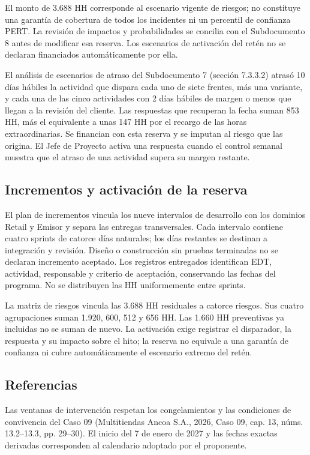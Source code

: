 \documentclass[11pt]{article}
\begin{document}
El monto de 3.688 HH corresponde al escenario vigente de riesgos; no constituye una garantía de cobertura de todos los incidentes ni un percentil de confianza PERT. La revisión de impactos y probabilidades se concilia con el Subdocumento 8 antes de modificar esa reserva. Los escenarios de activación del retén no se declaran financiados automáticamente por ella.

El análisis de escenarios de atraso del Subdocumento 7 (sección 7.3.3.2) atrasó 10 días hábiles la actividad que dispara cada uno de siete frentes, más una variante, y cada una de las cinco actividades con 2 días hábiles de margen o menos que llegan a la revisión del cliente. Las respuestas que recuperan la fecha suman 853 HH, más el equivalente a unas 147 HH por el recargo de las horas extraordinarias. Se financian con esta reserva y se imputan al riesgo que las origina. El Jefe de Proyecto activa una respuesta cuando el control semanal muestra que el atraso de una actividad supera su margen restante.

\subsection{Incrementos y activación de la reserva}

El plan de incrementos vincula los nueve intervalos de desarrollo con los dominios Retail y Emisor y separa las entregas transversales. Cada intervalo contiene cuatro sprints de catorce días naturales; los días restantes se destinan a integración y revisión. Diseño o construcción sin pruebas terminadas no se declaran incremento aceptado. Los registros entregados identifican EDT, actividad, responsable y criterio de aceptación, conservando las fechas del programa. No se distribuyen las HH uniformemente entre sprints.

La matriz de riesgos vincula las 3.688 HH residuales a catorce riesgos. Sus cuatro agrupaciones suman 1.920, 600, 512 y 656 HH. Las 1.660 HH preventivas ya incluidas no se suman de nuevo. La activación exige registrar el disparador, la respuesta y su impacto sobre el hito; la reserva no equivale a una garantía de confianza ni cubre automáticamente el escenario extremo del retén.

\subsection{Referencias}

Las ventanas de intervención respetan los congelamientos y las condiciones de convivencia del Caso 09 (Multitiendas Ancoa S.A., 2026, Caso 09, cap. 13, núms. 13.2--13.3, pp. 29--30). El inicio del 7 de enero de 2027 y las fechas exactas derivadas corresponden al calendario adoptado por el proponente.
\end{document}
